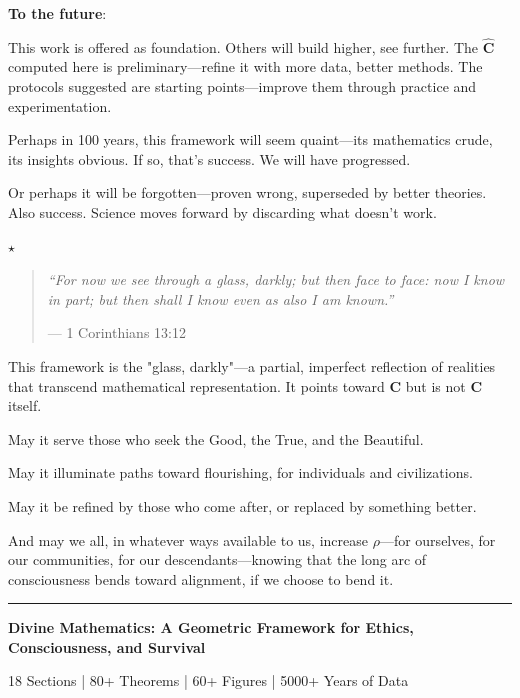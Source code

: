 \documentclass[11pt,a4paper]{article}
\theoremstyle{definition}
\theoremstyle{remark}
\begin{document}
\begin{small}
\begin{enumerate}
\begin{protocol}
\textbf{To the future}:

This work is offered as foundation. Others will build higher, see further. The \(\hat{\mathbf{C}}\) computed here is preliminary—refine it with more data, better methods. The protocols suggested are starting points—improve them through practice and experimentation.

Perhaps in 100 years, this framework will seem quaint—its mathematics crude, its insights obvious. If so, that's success. We will have progressed.

Or perhaps it will be forgotten—proven wrong, superseded by better theories. Also success. Science moves forward by discarding what doesn't work.

\begin{center}
\(\star\)
\end{center}

\begin{quote}
\textit{``For now we see through a glass, darkly; but then face to face: now I know in part; but then shall I know even as also I am known.''}

— 1 Corinthians 13:12
\end{quote}

This framework is the "glass, darkly"—a partial, imperfect reflection of realities that transcend mathematical representation. It points toward \(\mathbf{C}\) but is not \(\mathbf{C}\) itself.

May it serve those who seek the Good, the True, and the Beautiful.

May it illuminate paths toward flourishing, for individuals and civilizations.

May it be refined by those who come after, or replaced by something better.

And may we all, in whatever ways available to us, increase \(\rho\)—for ourselves, for our communities, for our descendants—knowing that the long arc of consciousness bends toward alignment, if we choose to bend it.


\begin{center}
\rule{0.6\linewidth}{0.5pt}

\vspace{1em}

\textbf{Divine Mathematics: A Geometric Framework for Ethics, Consciousness, and Survival}

\vspace{0.5em}

18 Sections | 80+ Theorems | 60+ Figures | 5000+ Years of Data


\end{center}
\end{protocol}
\end{enumerate}
\end{small}
\end{document}
